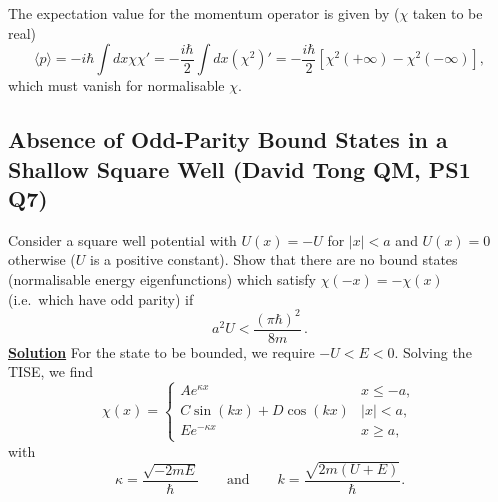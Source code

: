 The expectation value for the momentum operator is given by ($\chi$ taken to be real)
\begin{equation}
    \langle p\rangle = -i\hbar\int dx \chi\chi' = -\frac{i\hbar}{2}\int dx (\chi^2)' = -\frac{i\hbar}{2}[\chi^2(+\infty) - \chi^2(-\infty)],
\end{equation}
which must vanish for normalisable $\chi$.

\subsection{Absence of Odd-Parity Bound States in a Shallow Square Well (David Tong QM, PS1 Q7)}
\label{sec:square-well}

Consider a square well potential with $U(x) = -U$ for $|x| < a$
and $U(x) = 0$ otherwise ($U$ is a positive constant). Show that there are no
bound states (normalisable energy eigenfunctions) which satisfy
$\chi(-x) = -\chi(x)$ (i.e.\ which have odd parity) if
%
\begin{equation}
  a^2 U < \frac{(\pi\hbar)^2}{8m}\,.
  \label{eq:shallow-condition}
\end{equation}
\underline{\textbf{Solution}} For the state to be bounded, we require $-U<E<0$. Solving the TISE, we find
\begin{equation}
    \chi(x) = \begin{cases}
        Ae^{\kappa x} & x\leq-a,\\
        C\sin(kx)+ D\cos(kx) & |x|<a,\\
        Ee^{-\kappa x} & x\geq a,
    \end{cases}
\end{equation}
with
\begin{equation}
    \kappa = \frac{\sqrt{-2mE}}{\hbar} \qquad   \text{and} \qquad k = \frac{\sqrt{2m(U+E)}}{\hbar}.
\end{equation}

